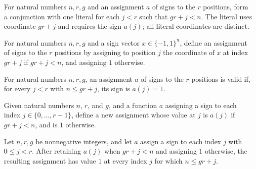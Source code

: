 \begin{definition}
\label{FABL.parityBlockMinterm}
\leanok
{}
For natural numbers $n,r,g$ and an assignment $a$ of signs to the $r$ positions, form a
conjunction with one literal for each $j<r$ such that $g r+j<n$. The literal uses
coordinate $g r+j$ and requires the sign $a(j)$; all literal coordinates are distinct.
\end{definition}

\begin{definition}
\label{FABL.parityBlockValue}
\leanok
{}
For natural numbers $n,r,g$ and a sign vector $x\in\{-1,1\}^n$, define an assignment of
signs to the $r$ positions by assigning to position $j$ the coordinate of $x$ at index
$gr+j$ if $gr+j<n$, and assigning $1$ otherwise.
\end{definition}

\begin{definition}
\label{FABL.IsValidParityBlockAssignment}
\leanok
{}
For natural numbers $n,r,g$, an assignment $a$ of signs to the $r$ positions is valid
if, for every $j<r$ with $n\le g r+j$, its sign is $a(j)=1$.
\end{definition}

\begin{definition}
\label{FABL.normalizeParityBlockAssignment}
\leanok
{}
Given natural numbers $n$, $r$, and $g$, and a function $a$ assigning a sign to each
index $j\in\{0,\ldots,r-1\}$, define a new assignment whose value at $j$ is $a(j)$ if
$gr+j<n$, and is $1$ otherwise.
\end{definition}

\begin{theorem}
\label{FABL.normalizeParityBlockAssignment_valid}
\leanok
{}
Let $n,r,g$ be nonnegative integers, and let $a$ assign a sign to each index $j$ with
$0\le j<r$. After retaining $a(j)$ when $gr+j<n$ and assigning $1$ otherwise, the
resulting assignment has value $1$ at every index $j$ for which $n\le gr+j$.
\end{theorem}

